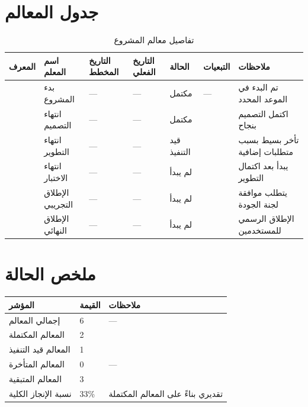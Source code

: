 \documentclass[11pt,a4paper]{article}
\begin{document}
\section{جدول المعالم}
\label{sec:milestones}

\begin{table}[H]
\centering
\caption{تفاصيل معالم المشروع}
\renewcommand{\arraystretch}{1.4}
\small
\begin{tabularx}{\textwidth}{C{1.2cm} L{3cm} L{2cm} L{2cm} L{2cm} L{2.5cm} X}
\toprule
\textbf{المعرف} & \textbf{اسم المعلم} & \textbf{التاريخ المخطط} & \textbf{التاريخ الفعلي} & \textbf{الحالة} & \textbf{التبعيات} & \textbf{ملاحظات} \\
\midrule
{} & بدء المشروع & --- & --- & مكتمل & --- & تم البدء في الموعد المحدد \\
 & انتهاء التصميم & --- & --- & مكتمل &  & اكتمل التصميم بنجاح \\
 & انتهاء التطوير & --- & --- & قيد التنفيذ &  & تأخر بسيط بسبب متطلبات إضافية \\
 & انتهاء الاختبار & --- & --- & لم يبدأ &  & يبدأ بعد اكتمال التطوير \\
 & الإطلاق التجريبي & --- & --- & لم يبدأ &  & يتطلب موافقة لجنة الجودة \\
 & الإطلاق النهائي & --- & --- & لم يبدأ &  & الإطلاق الرسمي للمستخدمين \\
\bottomrule
\end{tabularx}
\end{table}

\section{ملخص الحالة}
\label{sec:summary}

\begin{table}[H]
\centering
\renewcommand{\arraystretch}{1.4}
\begin{tabularx}{\textwidth}{L{5cm} C{3cm} X}
\toprule
\textbf{المؤشر} & \textbf{القيمة} & \textbf{ملاحظات} \\
\midrule
إجمالي المعالم & 6 & --- \\
المعالم المكتملة & 2 &  \\
المعالم قيد التنفيذ & 1 &  \\
المعالم المتأخرة & 0 & --- \\
المعالم المتبقية & 3 &  \\
نسبة الإنجاز الكلية & 33\% & تقديري بناءً على المعالم المكتملة \\
\bottomrule
\end{tabularx}
\end{table}
\end{document}
